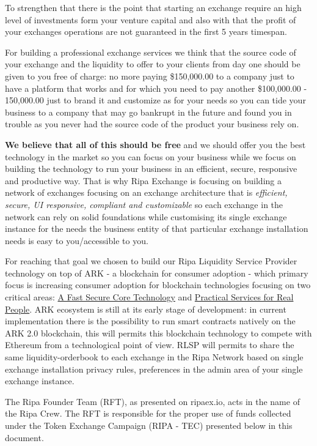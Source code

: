 \documentclass[11pt,fleqn,oneside]{book} %
\begin{document}
To strengthen that there is the point that starting an exchange require an high level of investments form your venture capital 
and also with that the profit of your exchanges operations are not guaranteed in the first 5 years timespan.

For building a professional exchange services we think that the source code of your exchange and the liquidity to offer to your clients
from day one should be given to you free of charge: no more paying \$150,000.00 to a company just to have a platform that works and for
which you need to pay another \$100,000.00 - 150,000.00 just to brand it and customize as for your needs so you can tide your 
business to a company that may go bankrupt in the future and found you in trouble as you never had the source code of the product
your business rely on.

\textbf{We believe that all of this should be free} and we should offer you the best technology in the market so you can focus on your business
while we focus on building the technology to run your business in an efficient, secure, responsive and productive way. That is why Ripa Exchange 
is focusing on building a network of exchanges focusing on an exchange architecture that is \textit{efficient, secure, UI responsive, compliant and customizable}
so each exchange in the network can rely on solid foundations while customising its single exchange instance for the needs 
the business entity of that particular exchange installation needs is easy to you/accessible to you.

For reaching that goal we chosen to build our Ripa Liquidity Service Provider technology on top of ARK - a blockchain for consumer adoption - 
which primary focus is increasing consumer adoption for blockchain technologies focusing on two critical areas: \underline{A Fast Secure Core Technology}
and \underline{Practical Services for Real People}. ARK ecosystem is still at its early stage of development: in current implementation 
there is the possibility to run smart contracts natively on the ARK 2.0 blockchain, this will permits this blockchain technology to compete 
with Ethereum from a technological point of view. RLSP will permits to share the same liquidity-orderbook to each exchange in the Ripa Network based on
single exchange installation privacy rules, preferences in the admin area of your single exchange instance.

The Ripa Founder Team (RFT), as presented on ripaex.io, acts in the name of the Ripa Crew. The RFT is responsible for the proper use of 
funds collected under the Token Exchange Campaign (RIPA - TEC) presented below in this document.
\end{document}
